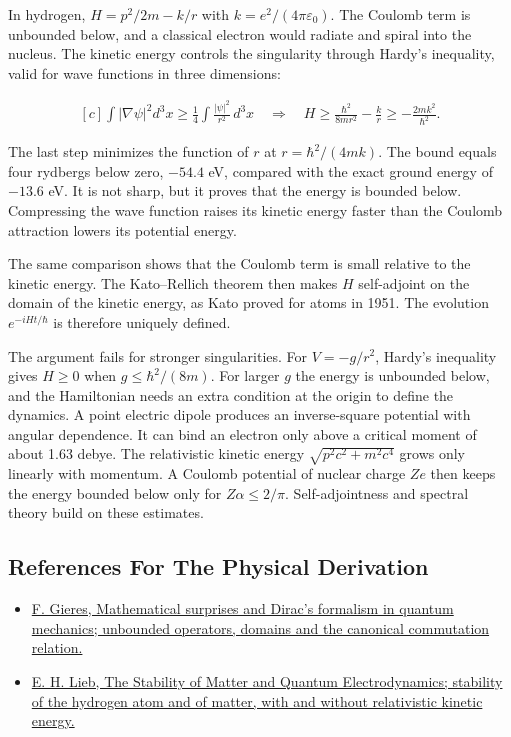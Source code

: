 \documentclass[11pt,oneside]{book}
\newenvironment{centeredalign}{\[\begin{gathered}[c]}{\end{gathered}\]}
\begin{document}
In hydrogen, \(H=p^2/2m-k/r\) with \(k=e^2/(4\pi\varepsilon_0)\). The Coulomb term is unbounded below, and a classical electron would radiate and spiral into the nucleus. The kinetic energy controls the singularity through Hardy's inequality, valid for wave functions in three dimensions:

\begin{centeredalign}
\int|\nabla\psi|^2d^3x\geq\frac14\int\frac{|\psi|^2}{r^2}\,d^3x
\quad\Longrightarrow\quad
H\geq\frac{\hbar^2}{8mr^2}-\frac{k}{r}\geq-\frac{2mk^2}{\hbar^2}.
\end{centeredalign}

The last step minimizes the function of \(r\) at \(r=\hbar^2/(4mk)\). The bound equals four rydbergs below zero, \(-54.4\) eV, compared with the exact ground energy of \(-13.6\) eV. It is not sharp, but it proves that the energy is bounded below. Compressing the wave function raises its kinetic energy faster than the Coulomb attraction lowers its potential energy.

The same comparison shows that the Coulomb term is small relative to the kinetic energy. The Kato--Rellich theorem then makes \(H\) self-adjoint on the domain of the kinetic energy, as Kato proved for atoms in 1951. The evolution \(e^{-iHt/\hbar}\) is therefore uniquely defined.

The argument fails for stronger singularities. For \(V=-g/r^2\), Hardy's inequality gives \(H\geq0\) when \(g\leq\hbar^2/(8m)\). For larger \(g\) the energy is unbounded below, and the Hamiltonian needs an extra condition at the origin to define the dynamics. A point electric dipole produces an inverse-square potential with angular dependence. It can bind an electron only above a critical moment of about 1.63 debye. The relativistic kinetic energy \(\sqrt{p^2c^2+m^2c^4}\) grows only linearly with momentum. A Coulomb potential of nuclear charge \(Ze\) then keeps the energy bounded below only for \(Z\alpha\leq2/\pi\). Self-adjointness and spectral theory build on these estimates.

\subsection*{References For The Physical Derivation}
\begin{itemize}
\item \href{https://arxiv.org/abs/quant-ph/9907069}{F. Gieres, Mathematical surprises and Dirac's formalism in quantum mechanics; unbounded operators, domains and the canonical commutation relation.}
\item \href{https://arxiv.org/abs/math-ph/0209034}{E. H. Lieb, The Stability of Matter and Quantum Electrodynamics; stability of the hydrogen atom and of matter, with and without relativistic kinetic energy.}
\end{itemize}
\end{document}
